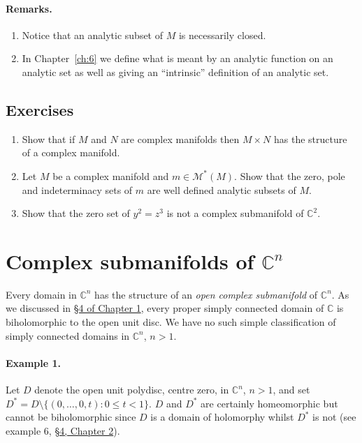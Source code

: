 \paragraph*{Remarks.}
\begin{enumerate}
\item Notice that an analytic subset of $M$ is necessarily closed.
\item In Chapter~\ref{ch:6} we define what is meant by an analytic function on an analytic set as well as giving an ``intrinsic'' definition of an analytic set.
\end{enumerate}

\subsection*{Exercises}
\begin{enumerate}
\item Show that if $M$ and $N$ are complex manifolds then $M\times N$ has the structure of a complex manifold.
\item Let $M$ be a complex manifold and $m\in\mathcal M^*(M)$. Show that the zero, pole and indeterminacy sets of $m$ are well defined analytic subsets of $M$.
\item Show that the zero set of $y^2=z^3$ is not a complex submanifold of $\mathbb C^2$.
\end{enumerate}

\section{\texorpdfstring{Complex submanifolds of $\mathbb C^n$}{Complex submanifolds of Cn}}\label{sec:4:2}
Every domain in $\mathbb C^n$ has the structure of an \emph{open complex submanifold} of $\mathbb C^n$. As we discussed in \hyperref[sec:1:4]{\S4 of Chapter 1}, every proper simply connected domain of $\mathbb C$ is biholomorphic to the open unit disc. We have no such simple classification of simply connected domains in $\mathbb C^n$, $n>1$.

\paragraph*{Example 1.} Let $D$ denote the open unit polydisc, centre zero, in $\mathbb C^n$, $n>1$, and set $D^*=D\setminus\{(0,\ldots,0,t):0\leq t<1\}$. $D$ and $D^*$ are certainly homeomorphic but cannot be biholomorphic since $D$ is a domain
of holomorphy whilst $D^*$ is not (see example 6, \hyperref[sec:2:4]{\S4, Chapter 2}).

